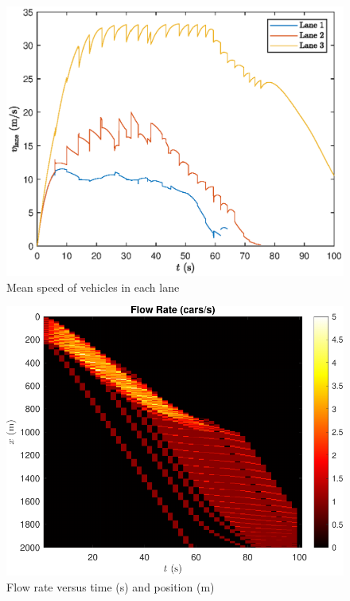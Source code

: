 \documentclass[12pt]{article}
\begin{document}
    \begin{figure}[H]
      \begin{center}
        \includegraphics[width=13cm]{mlbn_laneSpeed.eps}
        \caption{Mean speed of vehicles in each lane  }
        \label{fig:mean lane speed}
      \end{center}
    \end{figure}

    \begin{figure}[H]
      \begin{center}
        \includegraphics[width=13cm]{mlbn_flow.pdf}
        \caption{Flow rate versus time (s) and position (m)}
        \label{fig:multi lane flow}
      \end{center}
    \end{figure}
\end{document}
